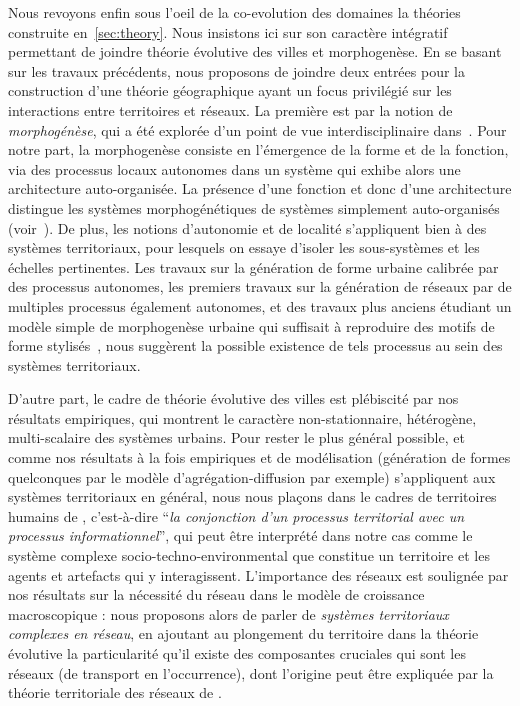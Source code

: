 Nous revoyons enfin sous l'oeil de la co-evolution des domaines la théories construite en~\ref{sec:theory}. Nous insistons ici sur son caractère intégratif permettant de joindre théorie évolutive des villes et morphogenèse. En se basant sur les travaux précédents, nous proposons de joindre deux entrées pour la construction d'une théorie géographique ayant un focus privilégié sur les interactions entre territoires et réseaux. La première est par la notion de \emph{morphogénèse}, qui a été explorée d'un point de vue interdisciplinaire dans~\cite{antelope2016interdisciplinary}. Pour notre part, la morphogenèse consiste en l'émergence de la forme et de la fonction, via des processus locaux autonomes dans un système qui exhibe alors une architecture auto-organisée. La présence d'une fonction et donc d'une architecture distingue les systèmes morphogénétiques de systèmes simplement auto-organisés (voir~\cite{doursat2012morphogenetic}). De plus, les notions d'autonomie et de localité s'appliquent bien à des systèmes territoriaux, pour lesquels on essaye d'isoler les sous-systèmes et les échelles pertinentes. Les travaux sur la génération de forme urbaine calibrée par des processus autonomes, les premiers travaux sur la génération de réseaux par de multiples processus également autonomes, et des travaux plus anciens étudiant un modèle simple de morphogenèse urbaine qui suffisait à reproduire des motifs de forme stylisés~\cite{raimbault2014hybrid}, nous suggèrent la possible existence de tels processus au sein des systèmes territoriaux. 

D'autre part, le cadre de théorie évolutive des villes est plébiscité par nos résultats empiriques, qui montrent le caractère non-stationnaire, hétérogène, multi-scalaire des systèmes urbains. Pour rester le plus général possible, et comme nos résultats à la fois empiriques et de modélisation (génération de formes quelconques par le modèle d'agrégation-diffusion par exemple) s'appliquent aux systèmes territoriaux en général, nous nous plaçons dans le cadres de territoires humains de \cite{raffestin1988reperes}, c'est-à-dire ``\textit{la conjonction d'un processus territorial avec un processus informationnel}'', qui peut être interprété dans notre cas comme le système complexe socio-techno-environmental que constitue un territoire et les agents et artefacts qui y interagissent. L'importance des réseaux est soulignée par nos résultats sur la nécessité du réseau dans le modèle de croissance macroscopique : nous proposons alors de parler de \emph{systèmes territoriaux complexes en réseau}, en ajoutant au plongement du territoire dans la théorie évolutive la particularité qu'il existe des composantes cruciales qui sont les réseaux (de transport en l'occurrence), dont l'origine peut être expliquée par la théorie territoriale des réseaux de \cite{dupuy1987vers}.

